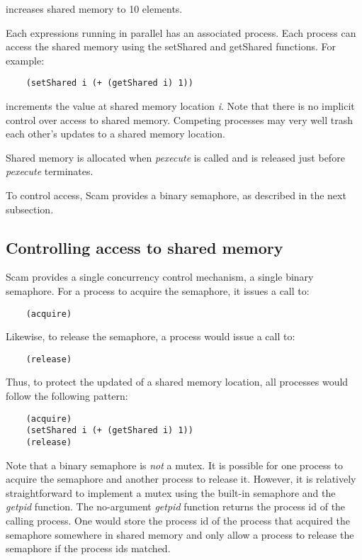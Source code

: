 {increases shared memory to 10 elements.

Each expressions running in parallel has an associated process. Each process
can access the shared memory using the setShared and getShared functions.
For example:

\begin{verbatim}
    (setShared i (+ (getShared i) 1))
\end{verbatim}

increments the value at shared memory location {\it i}. Note that there
is no implicit control over access to shared memory. Competing processes
may very well trash each other's updates to a shared memory location.

Shared memory is allocated when {\it pexecute} is called and is released
just before {\it pexecute} terminates.

To control access, Scam provides a binary semaphore, as described
in the next subsection.

\subsection{Controlling access to shared memory}

Scam provides a single concurrency control mechanism, a single binary
semaphore. For a process to acquire the semaphore, it issues a call to:

\begin{verbatim}
    (acquire)
\end{verbatim}

Likewise, to release the semaphore, a process would issue a call to:

\begin{verbatim}
    (release)
\end{verbatim}

Thus, to protect the updated of a shared memory location, all processes
would follow the following pattern:

\begin{verbatim}
    (acquire)
    (setShared i (+ (getShared i) 1))
    (release)
\end{verbatim}

Note that a binary semaphore is {\it not} a mutex. It is possible for
one process to acquire the semaphore and another process to release it.
However, it is relatively straightforward to implement a mutex using
the built-in semaphore and the {\it getpid} function. The no-argument
{\it getpid} function returns the process id of the calling process.
One would store the process id of the process that acquired
the semaphore somewhere in shared memory and only allow
a process to release the semaphore if the process ids matched.

}
